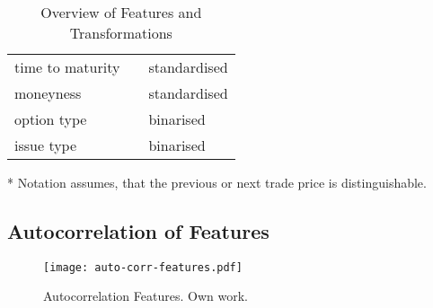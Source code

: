 \begin{table}[H]
\begin{threeparttable}
\begin{tabular}{@{}lll@{}}
            time to maturity        &                                                                                                  &  standardised         \\
            moneyness               &                                                                                                  &  standardised         \\
            option type             &                                                                                                  &  binarised         \\
            issue type              &                                                                                                  &  binarised         \\ \bottomrule
        \end{tabular}
        \begin{tablenotes}\footnotesize
            \item[*] Notation assumes, that the previous or next trade price is distinguishable.
        \end{tablenotes}
    \end{threeparttable}
    \caption[Overview of Features and Transformations]{Overview of Features and Transformations}
    \label{tab:features-transformations}
\end{table}

\newpage
\subsection{Autocorrelation of Features}
\label{app:autocorrelation-of-features}

\begin{figure}[ht]
    \centering
    \texttt{[image: auto-corr-features.pdf]}
    \caption[Autocorrelation of Features]{Autocorrelation Features. Own work.}
    \label{fig:auto-correlation-features}
\end{figure}

